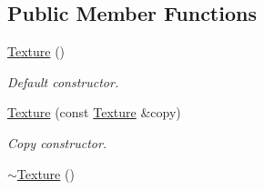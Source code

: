 \subsection*{Public Member Functions}
\begin{DoxyCompactItemize}
\item 
\hyperlink{classsf_1_1_texture_a3e04674853b8533bf981db3173e3a4a7}{Texture} ()
\begin{DoxyCompactList}\small\item\em Default constructor. \end{DoxyCompactList}\item 
\hyperlink{classsf_1_1_texture_a524855cbf89de3b74be84d385fd229de}{Texture} (const \hyperlink{classsf_1_1_texture}{Texture} \&copy)
\begin{DoxyCompactList}\small\item\em Copy constructor. \end{DoxyCompactList}\item 
\hypertarget{classsf_1_1_texture_a9c5354ad40eb1c5aeeeb21f57ccd7e6c}{\hyperlink{classsf_1_1_texture_a9c5354ad40eb1c5aeeeb21f57ccd7e6c}{$\sim$\+Texture} ()}\label{classsf_1_1_texture_a9c5354ad40eb1c5aeeeb21f57ccd7e6c}


\end{DoxyCompactItemize}
